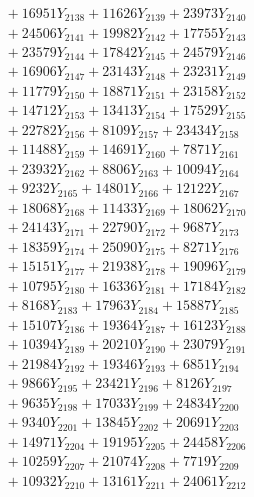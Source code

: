 \documentclass[a4paper,10pt]{article}
\begin{document}
{\begin{align}
&\;  + 16951 Y_{2138} + 11626 Y_{2139} + 23973 Y_{2140} \\[0.3ex]
&\;  + 24506 Y_{2141} + 19982 Y_{2142} + 17755 Y_{2143} \\[0.3ex]
&\;  + 23579 Y_{2144} + 17842 Y_{2145} + 24579 Y_{2146} \\[0.3ex]
&\;  + 16906 Y_{2147} + 23143 Y_{2148} + 23231 Y_{2149} \\[0.3ex]
&\;  + 11779 Y_{2150} + 18871 Y_{2151} + 23158 Y_{2152} \\[0.3ex]
&\;  + 14712 Y_{2153} + 13413 Y_{2154} + 17529 Y_{2155} \\[0.3ex]
&\;  + 22782 Y_{2156} + 8109 Y_{2157} + 23434 Y_{2158} \\[0.5ex]\allowbreak
&\;  + 11488 Y_{2159} + 14691 Y_{2160} + 7871 Y_{2161} \\[0.3ex]
&\;  + 23932 Y_{2162} + 8806 Y_{2163} + 10094 Y_{2164} \\[0.3ex]
&\;  + 9232 Y_{2165} + 14801 Y_{2166} + 12122 Y_{2167} \\[0.3ex]
&\;  + 18068 Y_{2168} + 11433 Y_{2169} + 18062 Y_{2170} \\[0.3ex]
&\;  + 24143 Y_{2171} + 22790 Y_{2172} + 9687 Y_{2173} \\[0.3ex]
&\;  + 18359 Y_{2174} + 25090 Y_{2175} + 8271 Y_{2176} \\[0.3ex]
&\;  + 15151 Y_{2177} + 21938 Y_{2178} + 19096 Y_{2179} \\[0.3ex]
&\;  + 10795 Y_{2180} + 16336 Y_{2181} + 17184 Y_{2182} \\[0.3ex]
&\;  + 8168 Y_{2183} + 17963 Y_{2184} + 15887 Y_{2185} \\[0.3ex]
&\;  + 15107 Y_{2186} + 19364 Y_{2187} + 16123 Y_{2188} \\[0.5ex]\allowbreak
&\;  + 10394 Y_{2189} + 20210 Y_{2190} + 23079 Y_{2191} \\[0.3ex]
&\;  + 21984 Y_{2192} + 19346 Y_{2193} + 6851 Y_{2194} \\[0.3ex]
&\;  + 9866 Y_{2195} + 23421 Y_{2196} + 8126 Y_{2197} \\[0.3ex]
&\;  + 9635 Y_{2198} + 17033 Y_{2199} + 24834 Y_{2200} \\[0.3ex]
&\;  + 9340 Y_{2201} + 13845 Y_{2202} + 20691 Y_{2203} \\[0.3ex]
&\;  + 14971 Y_{2204} + 19195 Y_{2205} + 24458 Y_{2206} \\[0.3ex]
&\;  + 10259 Y_{2207} + 21074 Y_{2208} + 7719 Y_{2209} \\[0.3ex]
&\;  + 10932 Y_{2210} + 13161 Y_{2211} + 24061 Y_{2212} \\[0.3ex]

\end{align}}
\end{document}
